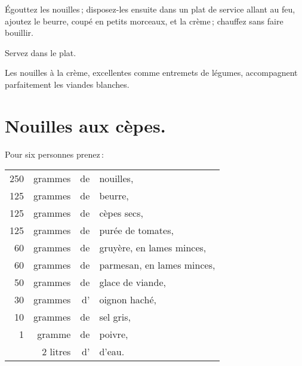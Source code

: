 Égouttez les nouilles ; disposez-les ensuite dans un plat de service allant au
feu, ajoutez le beurre, coupé en petits morceaux, et la crème ; chauffez sans
faire bouillir.

Servez dans le plat.

Les nouilles à la crème, excellentes comme entremets de légumes, accompagnent
parfaitement les viandes blanches.

\section*{\centering Nouilles aux cèpes.}
{}

Pour six personnes prenez :

\footnotesize
\begin{longtable}{rrrp{16em}}
    250 & grammes  & de & nouilles,                                                                       \\
    125 & grammes  & de & beurre,                                                                         \\
    125 & grammes  & de & cèpes secs,                                                                     \\
    125 & grammes  & de & purée de tomates,                                                               \\
     60 & grammes  & de & gruyère, en lames minces,                                                       \\
     60 & grammes  & de & parmesan, en lames minces,                                                      \\
     50 & grammes  & de & glace de viande,                                                                \\
     30 & grammes  & d' & oignon haché,                                                                   \\
     10 & grammes  & de & sel gris,                                                                       \\
      1 & gramme   & de & poivre,                                                                         \\
        & 2 litres & d' & d'eau.                                                                          \\
\end{longtable}
\normalsize

